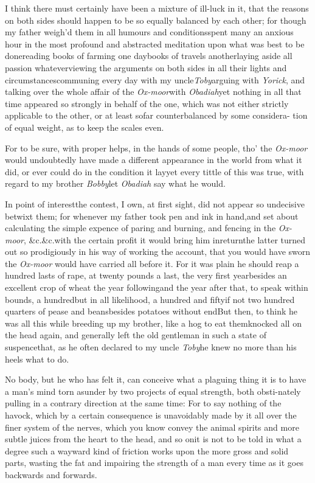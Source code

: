 \documentclass{article}
\begin{document}
\newpage
I think there must certainly have been a mixture of ill-luck in
it, that the reasons on both sides should happen to be so equally
balanced by each other; for though my father weigh’d them in
all humours and conditions\tsk spent many an anxious hour
in the most profound and abstracted meditation upon what was best
to be done\tsh reading books of farming one
day\tsk books of travels another\tsk laying aside
all passion whatever\break\tsk viewing the arguments on both sides in
all their lights and circumstances\tsk\break communing every day with
my uncle\break \textit{Toby}\tsk arguing with \textit{Yorick}, and talking
over the whole affair of the \textit{Ox-moor}\break with
\textit{Obadiah}\tsk yet nothing in all that time appeared
so strongly in behalf of the one, which was not either
strictly\break
applicable to the other, or at least so\break far counterbalanced
by some considera-\pb
tion of equal weight, as to keep the scales even.

For to be sure, with proper helps,\break
in the hands of some people, tho’\break
the \textit{Ox-moor} would undoubtedly have\break
made a different appearance in the world from what it did, or ever could
do in the condition it lay\tsk yet every tittle of this
was true, with regard to my brother \textit{Bobby}\tsh let
\textit{Obadiah} say what he\break
would.\tsh

In point of interest\tsh the contest, I own, at first
sight, did not appear so undecisive betwixt them; for whenever my
father took pen and ink in hand,\break and set about calculating the
simple expence of paring and burning, and fencing in the
\textit{Ox-moor}, \&c.\@ \&c.\tsk with the\break
certain profit it would bring him in\pb return\tsk the latter turned out so
prodigiously in his way of working the account, that you would have
sworn the \textit{Ox-moor} would have carried all before it. For it
was plain he should reap a hundred lasts of rape, at twenty pounds a last, the very first
year\tsk besides an excellent crop of wheat the year
following\tsk and the year after that, to speak within
bounds, a hundred\tsh but in all likelihood, a hundred and
fifty\tsk if not two hundred quarters of pease and
beans\tsk besides potatoes without end\tsk But
then, to think he was all this while breeding up my brother, like a
hog to eat them\tsk knocked all on the head again, and
generally left the old gentleman in such a state of
suspence\tsk that, as he often declared to my uncle
\textit{Toby}\tsk he knew no more than his heels what to
do.

\newpage
No body, but he who has felt it, can conceive what a plaguing
thing it is to have a man’s mind torn asunder by two projects
of equal strength, both obsti-\break nately pulling in a contrary direction
at the same time: For to say nothing of the havock, which by a
certain consequence is unavoidably made by it all over the finer
system of the nerves, which you know convey the animal spirits and more subtle
juices from the heart to the head, and so on\tsh it is not
to be told in what a degree such a wayward kind of friction works
upon the more gross and solid parts, wasting the fat and impairing
the strength of a man every time as it goes backwards and
forwards.
\end{document}
